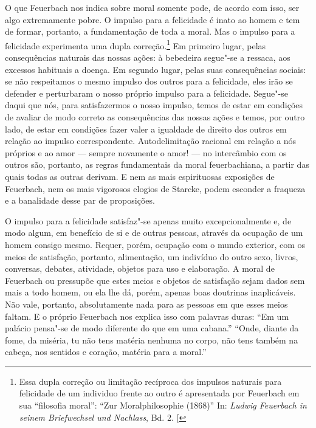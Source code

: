 O
que Feuerbach nos
indica sobre moral somente pode, de acordo com isso, ser algo
extremamente pobre. O impulso para a felicidade é inato ao homem e tem
de formar, portanto, a fundamentação de toda a moral. Mas o impulso para
a felicidade experimenta uma dupla correção.\footnote{Essa
  dupla correção ou limitação recíproca dos impulsos naturais para
  felicidade de um individuo frente ao outro é apresentada por Feuerbach
  em sua ``filosofia moral'': ``Zur Moralphilosophie (1868)'' In:
  \emph{Ludwig Feuerbach in seinem Briefwechsel und Nachlass}, Bd. 2. {[}\versal{N.\,T.}{]}}
Em primeiro lugar, pelas consequências naturais das nossas ações: à
bebedeira segue"-se a ressaca, aos excessos habituais a doença. Em
segundo lugar, pelas suas consequências sociais: se não respeitamos o
mesmo impulso dos outros para a felicidade, eles irão se defender e
perturbaram o nosso próprio impulso para a felicidade. Segue"-se daqui
que nós, para satisfazermos o nosso impulso, temos de estar em condições
de avaliar de modo correto as consequências das nossas ações e temos,
por outro lado, de estar em condições fazer valer a igualdade de direito
dos outros em relação ao impulso correspondente. Autodelimitação
racional em relação a nós próprios e ao amor --- sempre novamente o amor!
--- no intercâmbio com os outros são, portanto, as regras fundamentais da
moral feuerbachiana, a partir das quais todas as outras derivam. E nem
as mais espirituosas exposições
de Feuerbach,
nem os mais vigorosos elogios de Starcke, podem esconder a fraqueza e a
banalidade desse par de proposições.

O impulso para a felicidade satisfaz"-se apenas muito excepcionalmente e,
de modo algum, em benefício de si e de outras pessoas, através da
ocupação de um homem consigo mesmo. Requer, porém, ocupação com o mundo
exterior, com os meios de satisfação, portanto, alimentação, um
indivíduo do outro sexo, livros, conversas, debates, atividade, objetos
para uso e elaboração. A moral
de Feuerbach ou
pressupõe que estes meios e objetos de satisfação sejam dados sem mais a
todo homem, ou ela lhe dá, porém, apenas boas doutrinas inaplicáveis.
Não vale, portanto, absolutamente nada para as pessoas em que esses
meios faltam. E o
próprio Feuerbach nos
explica isso com palavras duras: ``Em um palácio pensa"-se de modo
diferente do que em uma cabana.'' ``Onde, diante da fome, da miséria, tu
não tens matéria nenhuma no corpo, não tens também na cabeça, nos
sentidos e coração, matéria para a moral.''


